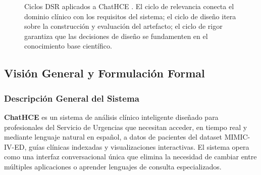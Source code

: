 \begin{figure}[t]
\caption{Ciclos DSR aplicados a ChatHCE \citep{Hevner2004}. El ciclo de relevancia conecta el dominio clínico con los requisitos del sistema; el ciclo de diseño itera sobre la construcción y evaluación del artefacto; el ciclo de rigor garantiza que las decisiones de diseño se fundamenten en el conocimiento base científico.}
\label{fig:dsr}
\end{figure}

\subsection{Visión General y Formulación Formal}
\label{sec:vision}

\subsubsection{Descripción General del Sistema}

\textbf{ChatHCE} es un sistema de análisis clínico inteligente diseñado para profesionales del Servicio de Urgencias que necesitan acceder, en tiempo real y mediante lenguaje natural en español, a datos de pacientes del dataset MIMIC-IV-ED, guías clínicas indexadas y visualizaciones interactivas. El sistema opera como una interfaz conversacional única que elimina la necesidad de cambiar entre múltiples aplicaciones o aprender lenguajes de consulta especializados.

